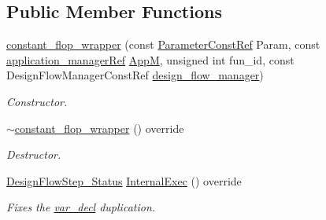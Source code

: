 \subsection*{Public Member Functions}
\begin{DoxyCompactItemize}
\item 
\hyperlink{classconstant__flop__wrapper_af5e724c3d57be6463c65ebe0d536d558}{constant\+\_\+flop\+\_\+wrapper} (const \hyperlink{Parameter_8hpp_a37841774a6fcb479b597fdf8955eb4ea}{Parameter\+Const\+Ref} Param, const \hyperlink{application__manager_8hpp_a04ccad4e5ee401e8934306672082c180}{application\+\_\+manager\+Ref} \hyperlink{classFrontendFlowStep_a0ac0d8db2a378416583f51c4faa59d15}{AppM}, unsigned int fun\+\_\+id, const Design\+Flow\+Manager\+Const\+Ref \hyperlink{classDesignFlowStep_ab770677ddf087613add30024e16a5554}{design\+\_\+flow\+\_\+manager})
\begin{DoxyCompactList}\small\item\em Constructor. \end{DoxyCompactList}\item 
\hyperlink{classconstant__flop__wrapper_aa84440ae06557264567580d2d0a4882e}{$\sim$constant\+\_\+flop\+\_\+wrapper} () override
\begin{DoxyCompactList}\small\item\em Destructor. \end{DoxyCompactList}\item 
\hyperlink{design__flow__step_8hpp_afb1f0d73069c26076b8d31dbc8ebecdf}{Design\+Flow\+Step\+\_\+\+Status} \hyperlink{classconstant__flop__wrapper_a5b36036f7cc799f0272e7301c79edaf6}{Internal\+Exec} () override
\begin{DoxyCompactList}\small\item\em Fixes the \hyperlink{structvar__decl}{var\+\_\+decl} duplication. \end{DoxyCompactList}\end{DoxyCompactItemize}
